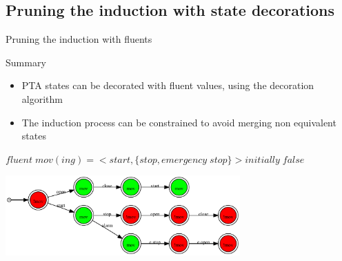 \documentclass[11pt]{beamer}
\begin{document}
\subsection{Pruning the induction with state decorations}
\begin{frame}{Pruning the induction with fluents}
	\begin{block}{Summary}
		\begin{itemize}
			\item PTA states can be decorated with fluent values, using the decoration algorithm
			\item The induction process can be constrained to avoid merging non equivalent states
		\end{itemize}
	\end{block}
	\begin{center}
		$fluent\;mov(ing) = <start, \{stop, emergency\;stop\}> initially\;false$
	\end{center}
	\begin{center}
		\includegraphics[width=9cm]{train_pta.pdf}
	\end{center}
\end{frame}
\end{document}
